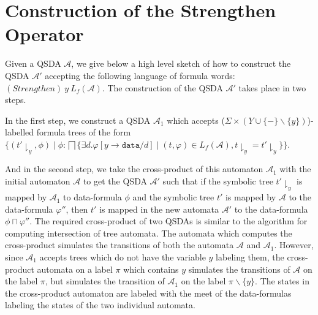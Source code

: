 \documentclass{llncs}
\newcommand{\A}{\mathcal{A}}
\newcommand{\data}{\texttt{data}}
\begin{document}
\section{Construction of the Strengthen Operator}\label{app-strengthen}

Given a QSDA $\A$, we give below a high level sketch of how to construct the QSDA $\A'$ accepting the following language of formula words: $(Strengthen)~ y~ L_f(\A)$.
The construction of the QSDA $\A'$ takes place in two steps. 

In the first step, we construct a QSDA $\A_1$ which accepts ($\Sigma \times (Y \cup \{-\} \backslash \{y\})$)-labelled formula trees of the form $\big\{(t' \downharpoonright_y, \phi) \mid \phi: \bigsqcap \{ \exists d. \varphi[y\rightarrow\data/d] \mid (t, \varphi) \in L_f(\A), t \downharpoonright_y = t' \downharpoonright_y \} \big\}$. 

And in the second step, we take the cross-product of this automaton $\A_1$ with the initial automaton $\A$ to get the QSDA $\A'$ such that if the symbolic tree $t' \downharpoonright_y$ is mapped by $\A_1$ to data-formula $\phi$ and the symbolic tree $t'$ is mapped by $\A$ to the data-formula $\varphi''$, then $t'$ is mapped in the new automata $\A'$ to the data-formula $\phi \sqcap \varphi''$.
The required cross-product of two QSDAs is similar to the algorithm for computing intersection of tree automata.
The automata which computes the cross-product simulates the transitions of both the automata $\A$ and $\A_1$. 
However, since $\A_1$ accepts trees which do not have the variable $y$ labeling them, the cross-product automata on a label $\pi$ which contains $y$ simulates the transitions of $\A$ on the label $\pi$, but simulates the transition of $\A_1$ on the label $\pi \backslash \{y\}$.
 The states in the cross-product automaton are labeled with the meet of the data-formulas labeling the states of the two individual automata. 
\end{document}
